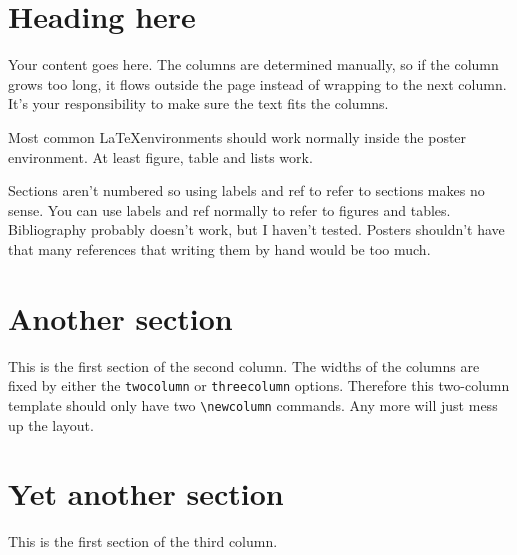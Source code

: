 \documentclass[final]{beamer}
\author{First Author$^1$, \\ Second Author$^2$}
\institute{$^1$Some Institute, \url{email.address@institute}, \\ $^2$Another Institute}
\begin{document}
\begin{poster}

\newcolumn

\section{Heading here}
Your content goes here. The columns are determined manually, so if the column grows too long, it flows outside the page instead of wrapping to the next column. It's your responsibility to make sure the text fits the columns. 

Most common \LaTeX environments should work normally inside the poster environment. At least figure, table and lists work.

Sections aren't numbered so using labels and ref to refer to sections makes no sense. You can use labels and ref normally to refer to figures and tables. Bibliography probably doesn't work, but I haven't tested. Posters shouldn't have that many references that writing them by hand would be too much.


\newcolumn

\section{Another section}
This is the first section of the second column. The widths of the columns are fixed by either the \texttt{twocolumn} or \texttt{threecolumn} options. Therefore this two-column template should only have two \verb+\newcolumn+ commands. Any more will just mess up the layout. 


\newcolumn

\section{Yet another section}
This is the first section of the third column.
	

\end{poster}
\end{document}
